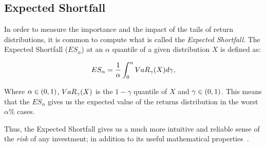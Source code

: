 \subsection*{Expected Shortfall}

In order to measure the importance and the impact of the tails of return distributions, it is common to compute what is called the \textit{Expected Shortfall}. The Expected Shortfall ($ES_{\alpha}$) at an $\alpha$ quantile of a given distribution $X$ is defined as:

\begin{align} \label{expected-shortfall}
ES_{\alpha} = \frac{1}{\alpha}\int_{0}^{\alpha}VaR_{\gamma}\qty(X)d\gamma \textit{,}
\end{align}

Where $\alpha \in \qty(0,1)$, $VaR_{\gamma}\qty(X)$ is the $1-\gamma$ quantile of $X$ and $\gamma \in \qty(0,1)$. This means that the $ES_{\alpha}$ gives us the expected value of the returns distribution in the worst $\alpha \%$ cases.

Thus, the Expected Shortfall gives us a much more intuitive and reliable sense of the \textit{risk} of any investment; in addition to its useful mathematical properties~\cite{a:bertsimas-shortfall}.

